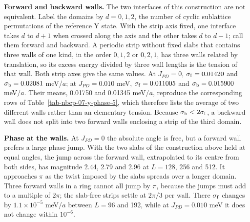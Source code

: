 \textbf{Forward and backward walls.} The two interfaces of this
construction are not equivalent. Label the domains by \(d=0,1,2\), the
number of cyclic sublattice permutations of the reference Y state. With
the strip axis fixed, one interface takes \(d\) to \(d+1\) when crossed
along the axis and the other takes \(d\) to \(d-1\); call them forward
and backward. A periodic strip without fixed slabs that contains three
walls of one kind, in the order \(0,1,2\) or \(0,2,1\), has three walls
related by translation, so its excess energy divided by three wall
lengths is the tension of that wall. Both strip axes give the same
values. At \(J_{PD}=0\), \(\sigma_{\rm f}=0.01420\) and
\(\sigma_{\rm b}=0.02081\) meV/\(a\); at \(J_{PD}=0.010\) meV,
\(\sigma_{\rm f}=0.011005\) and \(\sigma_{\rm b}=0.015900\) meV/\(a\).
Their means, 0.01750 and 0.01345 meV/\(a\), reproduce the corresponding
rows of Table~\ref{tab-nbcp-07-y-phase-5}, which therefore lists the
average of two different walls rather than an elementary tension.
Because \(\sigma_{\rm b}<2\sigma_{\rm f}\), a backward wall does not
split into two forward walls enclosing a strip of the third domain.

\textbf{Phase at the walls.} At \(J_{PD}=0\) the absolute angle is free,
but a forward wall prefers a large phase jump. With the two slabs of the
construction above held at equal angles, the jump across the forward
wall, extrapolated to its centre from both sides, has magnitude 2.44,
2.79 and 2.96 at \(L=128\), 256 and 512. It approaches \(\pi\) as the
twist imposed by the slabs spreads over a longer domain. Three forward
walls in a ring cannot all jump by \(\pi\), because the jumps must add
to a multiple of \(2\pi\); the slab-free strips settle at \(2\pi/3\) per
wall. There \(\sigma_{\rm f}\) changes by \(1.1\times10^{-5}\)
meV/\(a\) between \(L=96\) and 192, while at \(J_{PD}=0.010\) meV it
does not change within \(10^{-6}\).

